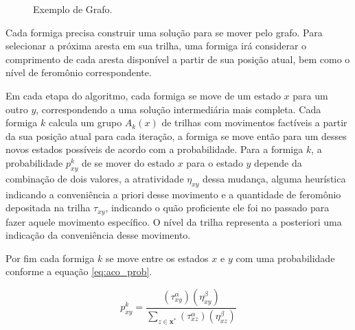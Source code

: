\begin{figure}[!hb]
\centering
\caption{Exemplo de Grafo.}
\label{fig:cap3_graph_example}
\end{figure}

Cada formiga precisa construir uma solução para se mover pelo grafo. Para selecionar a próxima aresta em sua trilha, uma formiga irá considerar o comprimento de cada aresta disponível a partir de sua posição atual, bem como o nível de feromônio correspondente.

Em cada etapa do algoritmo, cada formiga se move de um estado $\textit{x}$ para um outro $\textit{y}$, correspondendo a uma solução intermediária mais completa. Cada formiga $k$ calcula um grupo $A_{k}(x)$ de trilhas com movimentos factíveis a partir da sua posição atual para cada iteração, a formiga se move então para um desses novos estados possíveis de acordo com a probabilidade. Para a formiga $k$, a probabilidade $p_{xy}^{k}$ de se mover do estado $x$ para o estado $y$ depende da combinação de dois valores, a atratividade $\eta _{xy}$ dessa mudança, alguma heurística indicando a conveniência a priori desse movimento e a quantidade de feromônio depositada na trilha $\tau _{xy}$, indicando o quão proficiente ele foi no passado para fazer aquele movimento específico. O nível da trilha representa a posteriori uma indicação da conveniência desse movimento.

Por fim cada formiga $k$ se move entre os estados $x$ e $y$ com uma probabilidade conforme a equação \ref{eq:aco_prob}.

\begin{equation}
\label{eq:aco_prob}
    p_{xy}^k =
    \frac
    { (\tau_{xy}^{\alpha}) (\eta_{xy}^{\beta}) }
    { \sum_{z\in \mathbf{x^*}} (\tau_{xz}^{\alpha}) (\eta_{xz}^{\beta}) }
\end{equation}

